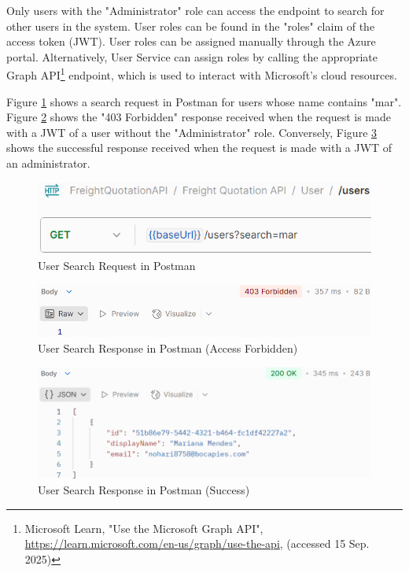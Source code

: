\documentclass[12pt, reqno, oneside]{amsbook}
\theoremstyle{definition}
\theoremstyle{definition}
\numberwithin{section}{chapter}
\numberwithin{table}{chapter}
\numberwithin{figure}{chapter}
\begin{document}
Only users with the "Administrator" role can access the endpoint to search for other users in the system. User roles can be found in the "roles" claim of the access token (\ac{JWT}). User roles can be assigned manually through the Azure portal. Alternatively, User Service can assign roles by calling the appropriate Graph \ac{API}\footnote{Microsoft Learn, "Use the Microsoft Graph API", \url{https://learn.microsoft.com/en-us/graph/use-the-api}, (accessed 15 Sep. 2025)} endpoint, which is used to interact with Microsoft's cloud resources.

Figure \ref{Figure:UserSearchRequestPostman} shows a search request in Postman for users whose name contains "mar". Figure \ref{UserSearchResponsePostmanForbidden} shows the "403 Forbidden" response received when the request is made with a \ac{JWT} of a user without the "Administrator" role. Conversely, Figure \ref{UserSearchResponsePostmanSuccess} shows the successful response received when the request is made with a \ac{JWT} of an administrator.

\begin{figure}[H]
  \centering
  \includegraphics[width=0.8\linewidth]{images/UserSearchRequestPostman.png}
  \caption{\label{Figure:UserSearchRequestPostman}User Search Request in Postman}
\end{figure}

\begin{figure}[H]
  \centering
  \includegraphics[width=0.9\linewidth]{images/UserSearchResponsePostmanForbidden.png}
  \caption{\label{UserSearchResponsePostmanForbidden}User Search Response in Postman (Access Forbidden)}
\end{figure}

\begin{figure}[H]
  \centering
  \includegraphics[width=0.9\linewidth]{images/UserSearchResponsePostmanSuccess.png}
  \caption{\label{UserSearchResponsePostmanSuccess}User Search Response in Postman (Success)}
\end{figure}
\end{document}
